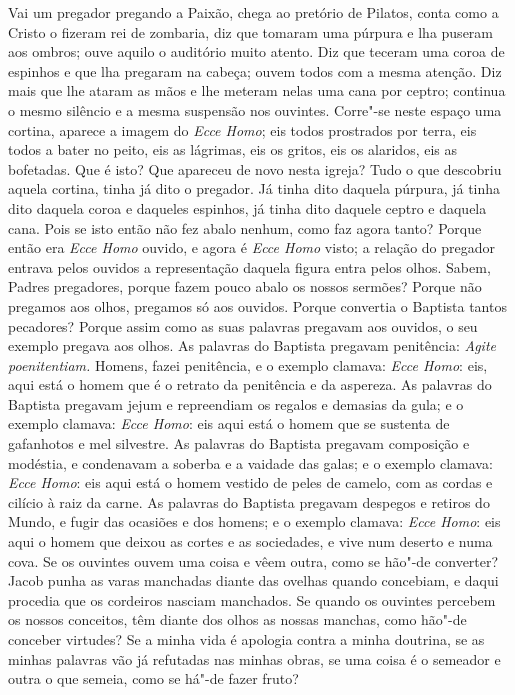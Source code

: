 Vai um pregador pregando a Paixão, chega ao pretório de Pilatos, conta como a Cristo o fizeram rei de zombaria, diz que tomaram
uma púrpura e lha puseram aos ombros; ouve aquilo o auditório muito
atento. Diz que teceram uma coroa de espinhos e que lha pregaram na
cabeça; ouvem todos com a mesma atenção. Diz mais que lhe ataram as
mãos e lhe meteram nelas uma cana por ceptro; continua o mesmo silêncio
e a mesma suspensão nos ouvintes. Corre"-se neste espaço uma cortina,
aparece a imagem do \emph{Ecce Homo}; eis todos prostrados por terra, eis todos a
bater no peito, eis as lágrimas, eis os gritos, eis os alaridos, eis as
bofetadas. Que é isto? Que apareceu de novo nesta igreja? Tudo o que
descobriu aquela cortina, tinha já dito o pregador. Já tinha dito
daquela púrpura, já tinha dito daquela coroa e daqueles espinhos, já
tinha dito daquele ceptro e daquela cana. Pois se isto então não fez
abalo nenhum, como faz agora tanto? Porque então era \emph{Ecce
Homo} ouvido, e agora é \emph{Ecce Homo} visto; a relação do pregador
entrava pelos ouvidos a representação daquela figura entra pelos olhos.
Sabem, Padres pregadores, porque fazem pouco abalo os nossos sermões? Porque não pregamos aos olhos, pregamos só aos ouvidos. Porque
convertia o Baptista tantos pecadores? Porque assim como as suas
palavras pregavam aos ouvidos, o seu exemplo pregava aos olhos. As
palavras do Baptista pregavam penitência: \emph{Agite poenitentiam.}
Homens, fazei penitência, e o exemplo clamava: \emph{Ecce Homo}: eis, aqui está o homem que
é o retrato da penitência e da aspereza. As palavras do Baptista
pregavam jejum e repreendiam os regalos e demasias da gula; e o exemplo
clamava: \emph{Ecce Homo}: eis aqui está o homem que se sustenta de
gafanhotos e mel silvestre. As palavras do Baptista pregavam composição
e modéstia, e condenavam a soberba e a vaidade das galas; e o exemplo
clamava: \emph{Ecce Homo}: eis aqui está o homem vestido de peles de
camelo, com as cordas e cilício à raiz da carne. As palavras do Baptista
pregavam despegos e retiros do Mundo, e fugir das ocasiões e dos
homens; e o exemplo clamava: \emph{Ecce Homo}: eis aqui o homem que
deixou as cortes e as sociedades, e vive num deserto e numa cova. Se os
ouvintes ouvem uma coisa e vêem outra, como se hão"-de converter? Jacob
punha as varas manchadas diante das ovelhas quando concebiam, e daqui
procedia que os cordeiros nasciam manchados. Se quando os ouvintes
percebem os nossos conceitos, têm diante dos olhos as nossas manchas,
como hão"-de conceber virtudes? Se a minha vida é apologia contra a minha
doutrina, se as minhas palavras vão já refutadas nas minhas obras, se
uma coisa é o semeador e outra o que semeia, como se há"-de fazer fruto?

